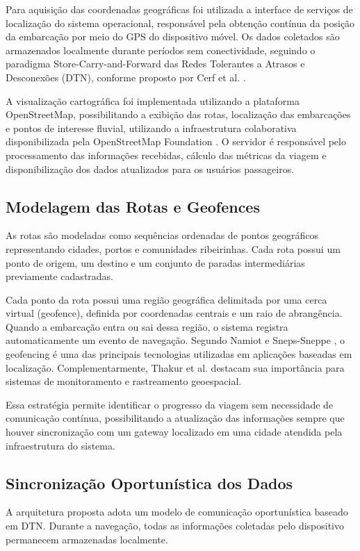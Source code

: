 \documentclass[12pt]{article}
\begin{document}
Para aquisição das coordenadas geográficas foi utilizada a interface de serviços de localização do sistema operacional, responsável pela obtenção contínua da posição da embarcação por meio do GPS do dispositivo móvel. Os dados coletados são armazenados localmente durante períodos sem conectividade, seguindo o paradigma Store-Carry-and-Forward das Redes Tolerantes a Atrasos e Desconexões (DTN), conforme proposto por Cerf et al. \cite{cerf2007rfc4838}.

A visualização cartográfica foi implementada utilizando a plataforma OpenStreetMap, possibilitando a exibição das rotas, localização das embarcações e pontos de interesse fluvial, utilizando a infraestrutura colaborativa disponibilizada pela OpenStreetMap Foundation \cite{openstreetmap}. O servidor é responsável pelo processamento das informações recebidas, cálculo das métricas da viagem e disponibilização dos dados atualizados para os usuários passageiros.

\subsection{Modelagem das Rotas e Geofences}
As rotas são modeladas como sequências ordenadas de pontos geográficos representando cidades, portos e comunidades ribeirinhas. Cada rota possui um ponto de origem, um destino e um conjunto de paradas intermediárias previamente cadastradas.

Cada ponto da rota possui uma região geográfica delimitada por uma cerca virtual (geofence), definida por coordenadas centrais e um raio de abrangência. Quando a embarcação entra ou sai dessa região, o sistema registra automaticamente um evento de navegação. Segundo Namiot e Sneps-Sneppe \cite{namiot2013geofencing}, o geofencing é uma das principais tecnologias utilizadas em aplicações baseadas em localização. Complementarmente, Thakur et al. \cite{thakur2020geofencing} destacam sua importância para sistemas de monitoramento e rastreamento geoespacial.

Essa estratégia permite identificar o progresso da viagem sem necessidade de comunicação contínua, possibilitando a atualização das informações sempre que houver sincronização com um gateway localizado em uma cidade atendida pela infraestrutura do sistema.

\subsection{Sincronização Oportunística dos Dados}
A arquitetura proposta adota um modelo de comunicação oportunística baseado em DTN. Durante a navegação, todas as informações coletadas pelo dispositivo permanecem armazenadas localmente.
\end{document}
